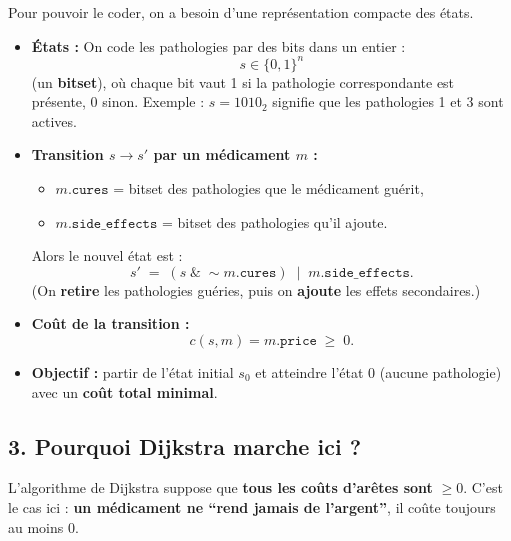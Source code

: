 Pour pouvoir le coder, on a besoin d’une représentation compacte des états. \\

\begin{itemize}[label=\(\triangleright\)]
  \item \textbf{États :}  
  On code les pathologies par des bits dans un entier :
  \[
    s \in \{0,1\}^n
  \]
  (un \textbf{bitset}), où chaque bit vaut 1 si la pathologie correspondante est présente, 0 sinon.  
  Exemple : \(s = 1010_2\) signifie que les pathologies 1 et 3 sont actives.

  \item \textbf{Transition \(s \to s'\) par un médicament \(m\) :}\\[-0.5em]
  \begin{itemize}
      \item \(m.\texttt{cures}\) = bitset des pathologies que le médicament guérit,
      \item \(m.\texttt{side\_effects}\) = bitset des pathologies qu’il ajoute.
  \end{itemize}
  Alors le nouvel état est :
  \[
     s' \;=\; (s \;\&\; \sim m.\texttt{cures}) \;\;|\;\; m.\texttt{side\_effects}.
  \]
  (On \textbf{retire} les pathologies guéries, puis on \textbf{ajoute} les effets secondaires.)

  \item \textbf{Coût de la transition :}  
  \[
    c(s,m) = m.\texttt{price} \;\ge\; 0.
  \]

  \item \textbf{Objectif :}  
  partir de l’état initial \(s_0\) et atteindre l’état \(0\) (aucune pathologie) avec un \textbf{coût total minimal}.
\end{itemize}

\subsection*{3. Pourquoi Dijkstra marche ici ?}

L’algorithme de Dijkstra suppose que \textbf{tous les coûts d’arêtes sont} $\ge 0$.  
C’est le cas ici : \textbf{un médicament ne “rend jamais de l’argent”}, il coûte toujours au moins 0.

